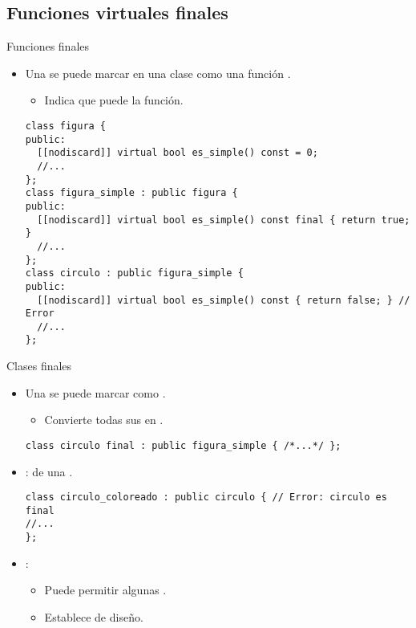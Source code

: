 \subsection{Funciones virtuales finales}

\begin{frame}[t,fragile]{Funciones finales}
\begin{itemize}
  \item Una  se puede marcar en una clase
        como una función .
    \begin{itemize}
      \item Indica que  puede  la función.
    \end{itemize}

\begin{lstlisting}
class figura {
public:
  [[nodiscard]] virtual bool es_simple() const = 0;
  //...
};
class figura_simple : public figura {
public:
  [[nodiscard]] virtual bool es_simple() const final { return true; }
  //...
};
class circulo : public figura_simple {
public:
  [[nodiscard]] virtual bool es_simple() const { return false; } // Error
  //...
};
\end{lstlisting}
\end{itemize}
\end{frame}

\begin{frame}[t,fragile]{Clases finales}
\begin{itemize}
  \item Una  se puede marcar como .
    \begin{itemize}
      \item Convierte todas sus  en .
    \end{itemize}
\begin{lstlisting}
class circulo final : public figura_simple { /*...*/ };
\end{lstlisting}

  \item {}:  de una .
\begin{lstlisting}
class circulo_coloreado : public circulo { // Error: circulo es final
//...
};
\end{lstlisting}

  \item {}:
    \begin{itemize}
      \item Puede permitir algunas .
      \item Establece  de diseño.
    \end{itemize}
\end{itemize}
\end{frame}

